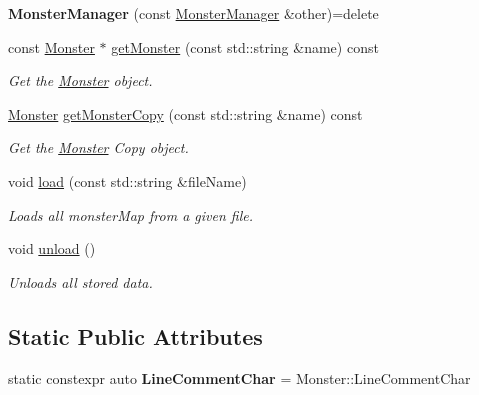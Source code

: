 \begin{DoxyCompactItemize}
\item 
\mbox{\label{classmonsterbattle_1_1monster_1_1MonsterManager_a91db66c756c5b8247192a442763be2f0}} 
{\bfseries Monster\+Manager} (const \hyperlink{classmonsterbattle_1_1monster_1_1MonsterManager}{Monster\+Manager} \&other)=delete
\item 
const \hyperlink{classmonsterbattle_1_1monster_1_1Monster}{Monster} $\ast$ \hyperlink{classmonsterbattle_1_1monster_1_1MonsterManager_a276863d722569f349641b5cd43cdc6ff}{get\+Monster} (const std\+::string \&name) const
\begin{DoxyCompactList}\small\item\em Get the \hyperlink{classmonsterbattle_1_1monster_1_1Monster}{Monster} object. \end{DoxyCompactList}\item 
\hyperlink{classmonsterbattle_1_1monster_1_1Monster}{Monster} \hyperlink{classmonsterbattle_1_1monster_1_1MonsterManager_aebeb74b8fc365a1e4ee2baff335d9a83}{get\+Monster\+Copy} (const std\+::string \&name) const
\begin{DoxyCompactList}\small\item\em Get the \hyperlink{classmonsterbattle_1_1monster_1_1Monster}{Monster} Copy object. \end{DoxyCompactList}\item 
void \hyperlink{classmonsterbattle_1_1monster_1_1MonsterManager_a48ee4cdd7559fd1d8686d9ba38f1008d}{load} (const std\+::string \&file\+Name)
\begin{DoxyCompactList}\small\item\em Loads all monster\+Map from a given file. \end{DoxyCompactList}\item 
\mbox{\label{classmonsterbattle_1_1monster_1_1MonsterManager_a8ff78757ac6cb19c30a1abee51c8e493}} 
void \hyperlink{classmonsterbattle_1_1monster_1_1MonsterManager_a8ff78757ac6cb19c30a1abee51c8e493}{unload} ()
\begin{DoxyCompactList}\small\item\em Unloads all stored data. \end{DoxyCompactList}\end{DoxyCompactItemize}
\subsection*{Static Public Attributes}
\begin{DoxyCompactItemize}
\item 
\mbox{\label{classmonsterbattle_1_1monster_1_1MonsterManager_a7736d0070815dd92687cd4efd20e6635}} 
static constexpr auto {\bfseries Line\+Comment\+Char} = Monster\+::\+Line\+Comment\+Char
\end{DoxyCompactItemize}
